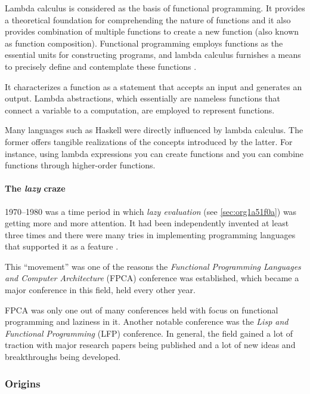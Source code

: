 \documentclass[a4paper, titlepage, twoside]{article}
\begin{document}
Lambda calculus is considered as the basis of functional programming. It provides a theoretical foundation for comprehending the nature of functions and it also provides combination of multiple functions to create a new function (also known as function composition). Functional programming employs functions as the essential units for constructing programs, and lambda calculus furnishes a means to precisely define and contemplate these functions  \autocite{pandaquestsRelationshipLambdaCalculus2023}.

It characterizes a function as a statement that accepts an input and generates an output. Lambda abstractions, which essentially are nameless functions that connect a variable to a computation, are employed to represent functions.

Many languages such as Haskell were directly influenced by lambda calculus. The former offers tangible realizations of the concepts introduced by the latter. For instance, using lambda expressions you can create functions and you can combine functions through higher-order functions.

\paragraph*{The \emph{lazy} craze}
\label{sec:orga4647b9}

1970--1980 was a time period in which \emph{lazy evaluation} (see \ref{sec:org1a51f0a}) was getting more and more attention. It had been independently invented at least three times and there were many tries in implementing programming languages that supported it as a feature \autocite{hudakHistoryHaskellBeing2007}.

This ``movement'' was one of the reasons the \emph{Functional Programming Languages and Computer Architecture} (FPCA) conference was established, which became a major conference in this field, held every other year.

FPCA was only one out of many conferences held with focus on functional programming and laziness in it. Another notable conference was the \emph{Lisp and Functional Programming} (LFP) conference. In general, the field gained a lot of traction with major research papers being published and a lot of new ideas and breakthroughs being developed.

\subsubsection{Origins}
\label{sec:org94c6e6e}
\end{document}
